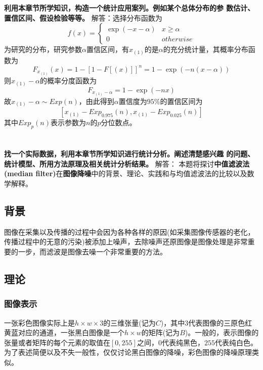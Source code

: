 \documentclass[UTF8]{article}
\begin{document}
	\section{}
	\textbf{利用本章节所学知识，构造一个统计应用案列。例如某个总体分布的参
	数估计、置信区间、假设检验等等。}
	\bigbreak
	解答：选择分布函数为
	$$f(x) =  \begin{cases} 
	\exp(-x-\alpha) & x\geq\alpha \\
	0 & otherwise
	\end{cases}
	$$
	为研究的分布，研究参数$\alpha$置信区间，有$x_{(1)}$的是$\alpha$的充分统计量，其概率分布函数为
	$$F_{x_{(1)}}(x)=1-[1-F[(x)]]^n=1-\exp(-n(x-\alpha))$$
	则$x_{(1)}-\alpha$的概率分度函数为
	$$F_{x_{(1)}-\alpha} = 1-\exp(-nx)$$
	故$x_{(1)}-\alpha \sim Exp(n)$，由此得到$\alpha$置信度为$95\%$的置信区间为
	$$[x_{(1)} - Exp_{0.975}(n), x_{(1)} - Exp_{0.025}(n)]$$
	其中$Exp_p(n)$表示参数为$n$的$p$分位数点。

	\section{}
	\textbf{找一个实际数据，利用本章节所学知识进行统计分析。阐述清楚感兴趣
		的问题、统计模型、所用方法原理及相关统计分析结果。}
	\bigbreak
	解答：
	本题将探讨\textbf{中值滤波法(median filter)}在\textbf{图像降噪}中的背景、理论、实践和与均值滤波法的比较以及数学解释。
	
	\subsection{背景}
	图像在采集以及传播的过程中会因为各种各样的原因(如采集图像传感器的老化，传播过程中的无意的污染)被添加上噪声，去除噪声还原图像是图像处理是非常重要的一步，而滤波是图像去噪一个非常重要的方法。
	
	\subsection{理论}
	\subsubsection{图像表示}
	一张彩色图像实际上是$h\times w \times 3$的三维张量(记为$C$)，其中$3$代表图像的三原色红黄蓝对应的通道，一张黑白图像是一个$h\times w$的矩阵(记为$B$)。一般的，表示图像的张量或者矩阵的每个元素的取值在$[0, 255]$之间，$0$代表纯黑色，$255$代表纯白色。为了表述简便以及不失一般性，仅仅讨论黑白图像的降噪，彩色图像的降噪原理类似。
\end{document}
